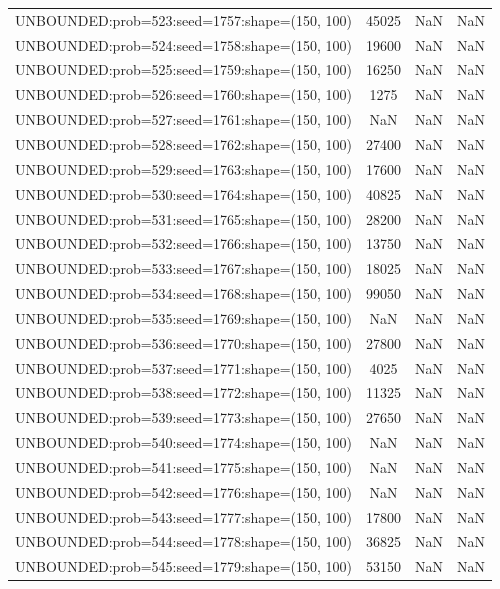 \begin{longtable}{lccc}
UNBOUNDED:prob=523:seed=1757:shape=(150, 100) & 45025 &   NaN &    NaN \\
UNBOUNDED:prob=524:seed=1758:shape=(150, 100) & 19600 &   NaN &    NaN \\
UNBOUNDED:prob=525:seed=1759:shape=(150, 100) & 16250 &   NaN &    NaN \\
UNBOUNDED:prob=526:seed=1760:shape=(150, 100) &  1275 &   NaN &    NaN \\
UNBOUNDED:prob=527:seed=1761:shape=(150, 100) &   NaN &   NaN &    NaN \\
UNBOUNDED:prob=528:seed=1762:shape=(150, 100) & 27400 &   NaN &    NaN \\
UNBOUNDED:prob=529:seed=1763:shape=(150, 100) & 17600 &   NaN &    NaN \\
UNBOUNDED:prob=530:seed=1764:shape=(150, 100) & 40825 &   NaN &    NaN \\
UNBOUNDED:prob=531:seed=1765:shape=(150, 100) & 28200 &   NaN &    NaN \\
UNBOUNDED:prob=532:seed=1766:shape=(150, 100) & 13750 &   NaN &    NaN \\
UNBOUNDED:prob=533:seed=1767:shape=(150, 100) & 18025 &   NaN &    NaN \\
UNBOUNDED:prob=534:seed=1768:shape=(150, 100) & 99050 &   NaN &    NaN \\
UNBOUNDED:prob=535:seed=1769:shape=(150, 100) &   NaN &   NaN &    NaN \\
UNBOUNDED:prob=536:seed=1770:shape=(150, 100) & 27800 &   NaN &    NaN \\
UNBOUNDED:prob=537:seed=1771:shape=(150, 100) &  4025 &   NaN &    NaN \\
UNBOUNDED:prob=538:seed=1772:shape=(150, 100) & 11325 &   NaN &    NaN \\
UNBOUNDED:prob=539:seed=1773:shape=(150, 100) & 27650 &   NaN &    NaN \\
UNBOUNDED:prob=540:seed=1774:shape=(150, 100) &   NaN &   NaN &    NaN \\
UNBOUNDED:prob=541:seed=1775:shape=(150, 100) &   NaN &   NaN &    NaN \\
UNBOUNDED:prob=542:seed=1776:shape=(150, 100) &   NaN &   NaN &    NaN \\
UNBOUNDED:prob=543:seed=1777:shape=(150, 100) & 17800 &   NaN &    NaN \\
UNBOUNDED:prob=544:seed=1778:shape=(150, 100) & 36825 &   NaN &    NaN \\
UNBOUNDED:prob=545:seed=1779:shape=(150, 100) & 53150 &   NaN &    NaN \\

\end{longtable}
